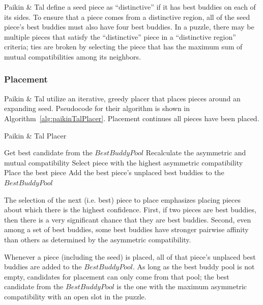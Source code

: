 \documentclass{report}
\begin{document}
Paikin \& Tal define a seed piece as ``distinctive'' if it has best buddies on each of its sides.  To ensure that a piece comes from a distinctive region, all of the seed piece's best buddies must also have four best buddies. In a puzzle, there may be multiple pieces that satisfy the ``distinctive'' piece in a ``distinctive region'' criteria; ties are broken by selecting the piece that has the maximum sum of mutual compatibilities among its neighbors.

\subsubsection{Placement}\label{sec:paikinTalPlacer}

Paikin \& Tal utilize an iterative, greedy placer that places pieces around an expanding seed.  Pseudocode for their algorithm is shown in Algorithm~\ref{alg:paikinTalPlacer}.  Placement continues all pieces have been placed.

\begin{algorithm}
\caption{Paikin \& Tal Placer}\label{alg:paikinTalPlacer}
\begin{algorithmic}[1]

      \State Get best candidate from the $BestBuddyPool$
   \Else
      \State Recalculate the asymmetric and mutual compatibility
      \State Select piece with the highest asymmetric compatibility
   \EndIf  
   \State Place the best piece
   \State Add the best piece's unplaced best buddies to the $BestBuddyPool$

\EndWhile
\end{algorithmic}
\end{algorithm}

The selection of the next (i.e. best) piece to place emphasizes placing pieces about which there is the highest confidence.  First, if two pieces are best buddies, then there is a very significant chance that they are best buddies.  Second, even among a set of best buddies, some best buddies have stronger pairwise affinity than others as determined by the asymmetric compatibility.

Whenever a piece (including the seed) is placed, all of that piece's unplaced best buddies are added to the $BestBuddyPool$.  As long as the best buddy pool is not empty, candidates for placement can only come from that pool; the best candidate from the $BestBuddyPool$ is the one with the maximum asymmetric compatibility with an open slot in the puzzle.  
\end{document}
